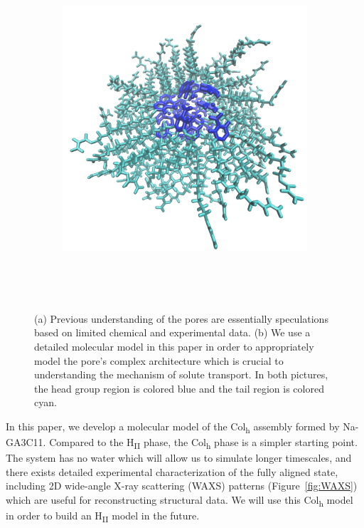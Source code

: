 \documentclass[journal=jpcbfk,manusciprt=article]{achemso}
\begin{document}
\begin{figure}[!htb]
\begin{subfigure}{0.45\linewidth}
		\includegraphics[width=\textwidth]{detailed_pore.png}
		\caption{}~\label{fig:detailed_pore}
	\end{subfigure}
    \caption{(a) Previous understanding of the pores are essentially speculations 
    based on limited chemical and experimental data. (b) We use a detailed molecular 
    model in this paper in order to appropriately model the pore's complex architecture
    which is crucial to understanding the mechanism of solute transport. In both 
    pictures, the head group region is colored blue and the tail region is colored cyan.}~\label{fig:detail}
  \end{figure}
 
  In this paper, we develop a molecular model of the Col\textsubscript{h} assembly 
  formed by Na-GA3C11. Compared to the H\textsubscript{II} phase, the Col\textsubscript{h}
  phase is a simpler starting point. The system has no water which will allow us
  to simulate longer timescales, and there exists detailed experimental
  characterization of the fully aligned state, including 2D wide-angle X-ray
  scattering (WAXS) patterns (Figure~\ref{fig:WAXS}) which are useful for reconstructing 
  structural data. We will use this Col\textsubscript{h} model in order to build an 
  H\textsubscript{II} model in the future.
  
\end{document}
